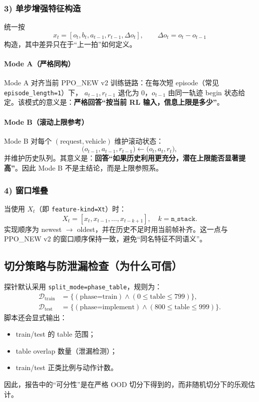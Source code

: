 ﻿\documentclass[11pt,a4paper]{ctexart}
\begin{document}
\subsubsection*{3) 单步增强特征构造}
统一按
\begin{equation}
x_t=[o_t,b_t,a_{t-1},r_{t-1},\Delta o_t],\qquad \Delta o_t=o_t-o_{t-1}
\end{equation}
构造，其中差异只在于“上一拍”如何定义。

\paragraph{Mode A（严格同构）}
Mode A 对齐当前 PPO\_NEW v2 训练链路：在每次短 episode（常见 \texttt{episode\_length=1}）下，
\(
a_{t-1},r_{t-1}
\)
退化为 0，\(
o_{t-1}
\)
由同一轨迹 begin 状态给定。该模式的意义是：\textbf{严格回答“按当前 RL 输入，信息上限是多少”}。

\paragraph{Mode B（滚动上限参考）}
Mode B 对每个 \((\text{request},\text{vehicle})\) 维护滚动状态：
\begin{equation}
\big(o_{t-1},a_{t-1},r_{t-1}\big)\leftarrow \big(o_t,a_t,r_t\big),
\end{equation}
并维护历史队列。其意义是：\textbf{回答“如果历史利用更充分，潜在上限能否显著提高”}。因此 Mode B 不是主结论，而是上限参照系。

\subsubsection*{4) 窗口堆叠}
当使用 \(X_t\)（即 \texttt{feature-kind=Xt}）时：
\begin{equation}
X_t=[x_t,x_{t-1},\ldots,x_{t-k+1}],\quad k=\texttt{n\_stack}.
\end{equation}
实现顺序为 newest $\rightarrow$ oldest，并在历史不足时用当前帧补齐。这一点与 PPO\_NEW v2 的窗口顺序保持一致，避免“同名特征不同语义”。

\subsection{切分策略与防泄漏检查（为什么可信）}
探针默认采用 \texttt{split\_mode=phase\_table}，规则为：
\begin{align}
\mathcal{D}_{\text{train}}&=\{(\text{phase=train})\land(0\le \text{table}\le 799)\},\\
\mathcal{D}_{\text{test}}&=\{(\text{phase=implement})\land(800\le \text{table}\le 999)\}.
\end{align}
脚本还会显式输出：
\begin{itemize}
  \item train/test 的 table 范围；
  \item table overlap 数量（泄漏检测）；
  \item train/test 正类比例与动作计数。
\end{itemize}
因此，报告中的“可分性”是在严格 OOD 切分下得到的，而非随机切分下的乐观估计。
\end{document}
